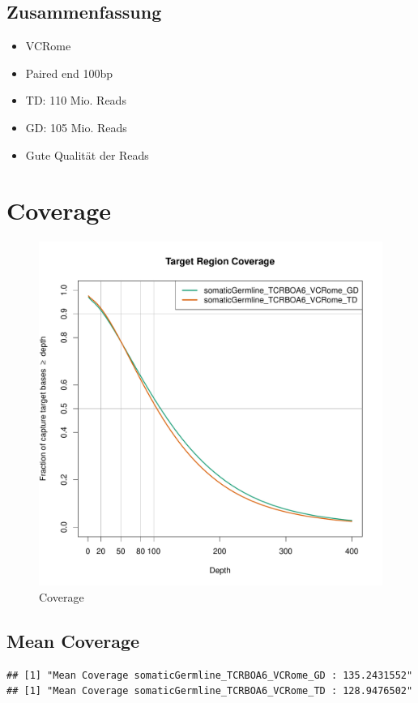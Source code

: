 \documentclass[woside,a4paper,12pt]{article}\usepackage[]{graphicx}\usepackage[]{color}
\makeatletter
\newenvironment{kframe}{%
 \def\at@end@of@kframe{}%
 \ifinner\ifhmode%
  \def\at@end@of@kframe{\end{minipage}}%
  \begin{minipage}{\columnwidth}%
 \fi\fi%
 \def\FrameCommand##1{\hskip\@totalleftmargin \hskip-\fboxsep
 \colorbox{shadecolor}{##1}\hskip-\fboxsep
     \hskip-\linewidth \hskip-\@totalleftmargin \hskip\columnwidth}%
 \MakeFramed {\advance\hsize-\width
   \@totalleftmargin\z@ \linewidth\hsize
   \@setminipage}}%
 {\par\unskip\endMakeFramed%
 \at@end@of@kframe}
\newenvironment{knitrout}{}{} %
\makeatother
\begin{document}
\subsection{Zusammenfassung}

\begin{itemize}
\item VCRome
\item Paired end 100bp
\item TD: 110 Mio. Reads
\item GD: 105 Mio. Reads
\item Gute Qualität der Reads
\end{itemize}

\section{Coverage}

\begin{figure}[H]
\centering
\includegraphics[width=\textwidth]{somaticGermline_TCRBOA6_VCRome_coverage_2019-02-08.pdf}
\caption{Coverage}
\label{fig:5}
\end{figure}

\subsection{Mean Coverage}
\begin{knitrout}
\color{fgcolor}\begin{kframe}
\begin{verbatim}
## [1] "Mean Coverage somaticGermline_TCRBOA6_VCRome_GD : 135.2431552"
## [1] "Mean Coverage somaticGermline_TCRBOA6_VCRome_TD : 128.9476502"
\end{verbatim}
\end{kframe}
\end{knitrout}
\end{document}
